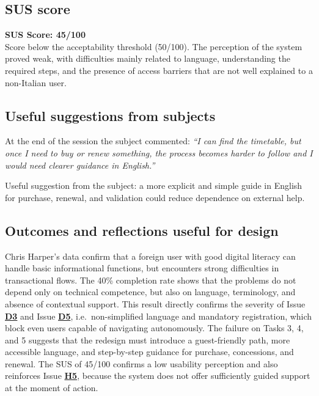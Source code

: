 ﻿\documentclass[11pt,a4paper]{article}
\begin{document}
\subsection*{SUS score}
\begin{tcolorbox}[base]
\textbf{SUS Score: 45/100}\\[0.2cm]
\small Score below the acceptability threshold (50/100). The perception of the system proved weak, with difficulties mainly related to language, understanding the required steps, and the presence of access barriers that are not well explained to a non-Italian user.
\end{tcolorbox}

\subsection*{Useful suggestions from subjects}
\begin{tcolorbox}[base]
At the end of the session the subject commented: \textit{``I can find the timetable, but once I need to buy or renew something, the process becomes harder to follow and I would need clearer guidance in English.''}

Useful suggestion from the subject: a more explicit and simple guide in English for purchase, renewal, and validation could reduce dependence on external help.
\end{tcolorbox}
\subsection*{Outcomes and reflections useful for design}
\begin{tcolorbox}[base]
Chris Harper's data confirm that a foreign user with good digital literacy can handle basic informational functions, but encounters strong difficulties in transactional flows. The 40\% completion rate shows that the problems do not depend only on technical competence, but also on language, terminology, and absence of contextual support. This result directly confirms the severity of Issue \textbf{\hyperref[iss:D3]{D3}} and Issue \textbf{\hyperref[iss:D5]{D5}}, i.e.\ non-simplified language and mandatory registration, which block even users capable of navigating autonomously. The failure on Tasks 3, 4, and 5 suggests that the redesign must introduce a guest-friendly path, more accessible language, and step-by-step guidance for purchase, concessions, and renewal. The SUS of 45/100 confirms a low usability perception and also reinforces Issue \textbf{\hyperref[iss:H5]{H5}}, because the system does not offer sufficiently guided support at the moment of action.
\end{tcolorbox}
\end{document}
